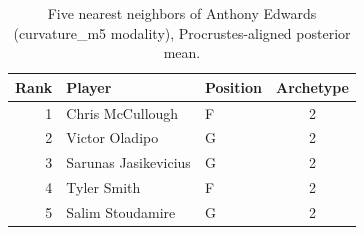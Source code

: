 \begin{table}[htbp]
  \centering\small
  \begin{tabular}{rllc}
    \toprule
    Rank & Player & Position & Archetype \\
    \midrule
    1 & Chris McCullough & F & 2 \\
    2 & Victor Oladipo & G & 2 \\
    3 & Sarunas Jasikevicius & G & 2 \\
    4 & Tyler Smith & F & 2 \\
    5 & Salim Stoudamire & G & 2 \\
    \bottomrule
  \end{tabular}
  \caption{Five nearest neighbors of Anthony Edwards (curvature_m5 modality), Procrustes-aligned posterior mean.}
  \label{tab:Anthony_Edwards_neighbors_curvature_m5}
\end{table}

